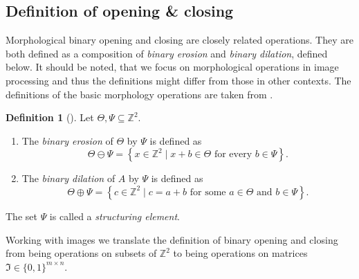 \documentclass[a4paper,12pt]{article}
\theoremstyle{plain}
\theoremstyle{definition}
\newtheorem{definition}[theorem]{Definition}
\begin{document}
\subsection{Definition of opening \& closing}

Morphological binary opening and closing are closely related operations. They are both defined as a composition of \emph{binary erosion} and \emph{binary dilation}, defined below. It should be noted, that we focus on morphological operations in image processing and thus the definitions might differ from those in other contexts. The definitions of the basic morphology operations are taken from \cite{imageprocessing}.

\begin{definition}[{\cite[p.~64-68]{imageprocessing}}]
	Let $\Theta, \Psi \subseteq \mathbb{Z}^2$.
	\begin{enumerate}
		\item The \emph{binary erosion} of $\Theta$ by $\Psi$ is defined as
		\begin{equation*}
			\Theta \ominus \Psi = \left\{ x \in \mathbb{Z}^2 \mid x + b \in \Theta \textrm{ for every } b \in \Psi \right\}.
		\end{equation*}
		\item The \emph{binary dilation} of $A$ by $\Psi$ is defined as
		\begin{equation*}
			\Theta \oplus \Psi = \left\{ c \in \mathbb{Z}^2 \mid c = a + b \textrm{ for some } a \in \Theta \textrm{ and } b \in \Psi \right\}.
		\end{equation*}
	\end{enumerate}
	The set $\Psi$ is called a \emph{structuring element}.
\end{definition}

Working with images we translate the definition of binary opening and closing from being operations on subsets of $\mathbb{Z}^2$ to being operations on matrices $\mathfrak{I} \in \{ 0, 1 \}^{m \times n}$.
\end{document}
